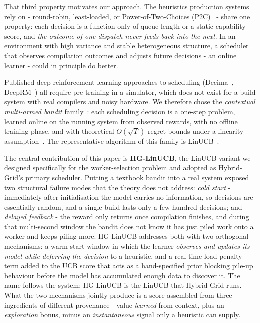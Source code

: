 \documentclass[final,5p,times,twocolumn]{elsarticle}
\begin{document}
That third property motivates our approach. The heuristics production systems rely on - round-robin, least-loaded, or Power-of-Two-Choices (P2C)~\cite{mitzenmacher2001} - share one property: each decision is a function only of queue length or a static capability score, and \emph{the outcome of one dispatch never feeds back into the next}. In an environment with high variance and stable heterogeneous structure, a scheduler that observes compilation outcomes and adjusts future decisions - an online learner - could in principle do better.

Published deep reinforcement-learning approaches to scheduling (Decima~\cite{decima}, DeepRM~\cite{deeprm}) all require pre-training in a simulator, which does not exist for a build system with real compilers and noisy hardware. We therefore chose the \emph{contextual multi-armed bandit} family~\cite{slivkins2019,lattimore2020}: each scheduling decision is a one-step problem, learned online on the running system from observed rewards, with no offline training phase, and with theoretical $O(\sqrt{T})$ regret bounds under a linearity assumption~\cite{chu2011}. The representative algorithm of this family is LinUCB~\cite{li2010}.

The central contribution of this paper is \textbf{HG-LinUCB}, the LinUCB variant we designed specifically for the worker-selection problem and adopted as Hybrid-Grid's primary scheduler. Putting a textbook bandit into a real system exposed two structural failure modes that the theory does not address: \emph{cold start} - immediately after initialisation the model carries no information, so decisions are essentially random, and a single build lasts only a few hundred decisions; and \emph{delayed feedback} - the reward only returns once compilation finishes, and during that multi-second window the bandit does not know it has just piled work onto a worker and keeps piling more. HG-LinUCB addresses both with two orthogonal mechanisms: a warm-start window in which the learner \emph{observes and updates its model while deferring the decision} to a heuristic, and a real-time load-penalty term added to the UCB score that acts as a hand-specified prior blocking pile-up behaviour before the model has accumulated enough data to discover it. The name follows the system: HG-LinUCB is the LinUCB that Hybrid-Grid runs. What the two mechanisms jointly produce is a score assembled from three ingredients of different provenance - value \emph{learned} from context, plus an \emph{exploration} bonus, minus an \emph{instantaneous} signal only a heuristic can supply.
\end{document}
